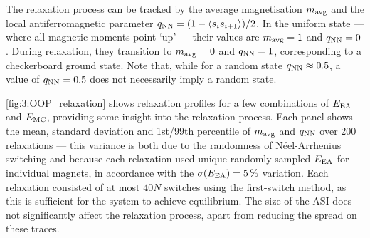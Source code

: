The relaxation process can be tracked by the average magnetisation $m_\mathrm{avg}$ and the local antiferromagnetic parameter $q_\mathrm{NN} = (1 - \langle s_i s_{i+1} \rangle)/2$.
In the uniform state --- where all magnetic moments point `up' --- their values are $m_\mathrm{avg}=1$ and $q_\mathrm{NN}=0$.
During relaxation, they transition to $m_\mathrm{avg}=0$ and $q_\mathrm{NN}=1$, corresponding to a checkerboard ground state.
Note that, while for a random state $q_\mathrm{NN} \approx 0.5$, a value of $q_\mathrm{NN}=0.5$ does not necessarily imply a random state. \par

\cref{fig:3:OOP_relaxation} shows relaxation profiles for a few combinations of $E_\mathrm{EA}$ and $E_\mathrm{MC}$, providing some insight into the relaxation process.
Each panel shows the mean, standard deviation and 1st/99th percentile of $m_\mathrm{avg}$ and $q_\mathrm{NN}$ over 200 relaxations --- this variance is both due to the randomness of N\'eel-Arrhenius switching and because each relaxation used unique randomly sampled $E_\mathrm{EA}$ for individual magnets, in accordance with the $\sigma(E_\mathrm{EA}) = \SI{5}{\percent}$ variation.
Each relaxation consisted of at most $40N$ switches using the first-switch method, as this is sufficient for the system to achieve equilibrium.
The size of the ASI does not significantly affect the relaxation process, apart from reducing the spread on these traces.



